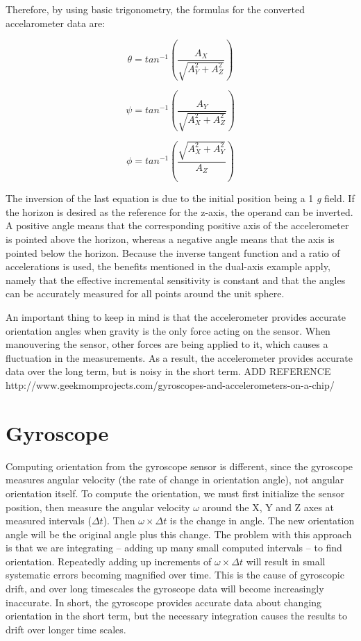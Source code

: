 Therefore, by using basic trigonometry, the formulas for the converted accelarometer data are:

\begin{equation}	
 	\theta=tan^{-1}(\frac{A_{X}}{\sqrt{A_{Y}^{2}+A_{Z}^{2}}})
 \end{equation}
 
 \begin{equation}	
 	\psi=tan^{-1}(\frac{A_{Y}}{\sqrt{A_{X}^{2}+A_{Z}^{2}}})
 \end{equation}
 
 \begin{equation}	
 	\phi=tan^{-1}(\frac{\sqrt{A_{X}^{2}+A_{Y}^{2}}}{A_{Z}})
 \end{equation}
 
The inversion of the last equation is due to the initial position being a 1 \textit{g} field. If the horizon is desired as the reference for the z-axis, the operand can be inverted. A positive angle means that the corresponding positive axis of the accelerometer is pointed above the horizon, whereas a negative angle means that the axis is pointed below the horizon. Because the inverse tangent function and a ratio of accelerations is used, the benefits mentioned in the dual-axis example apply, namely that the effective incremental sensitivity is constant and that the angles can be accurately measured for all points around the unit sphere.

An important thing to keep in mind is that the accelerometer provides accurate orientation angles when gravity is the only force acting on the sensor. When manouvering the sensor, other forces are being applied to it, which causes a fluctuation in the measurements. As a result, the accelerometer provides accurate data over the long term, but is noisy in the short term. ADD REFERENCE http://www.geekmomprojects.com/gyroscopes-and-accelerometers-on-a-chip/

\section{Gyroscope}
Computing orientation from the gyroscope sensor is different, since the gyroscope measures angular velocity (the rate of change in orientation angle), not angular orientation itself. To compute the orientation, we must first initialize the sensor position, then measure the angular velocity $\omega$ around the X, Y and Z axes at measured intervals ($\Delta t$).   Then $\omega \times \Delta t$ is the change in angle. The new orientation angle will be the original angle plus this change. The problem with this approach is that we are integrating – adding up many small computed intervals – to find orientation.  Repeatedly adding up increments of  $\omega \times \Delta t$ will result in small systematic errors becoming magnified over time. This is the cause of gyroscopic drift, and over long timescales the gyroscope data will become increasingly inaccurate. In short, the gyroscope provides accurate data about changing orientation in the short term, but the necessary integration causes the results to drift over longer time scales.

